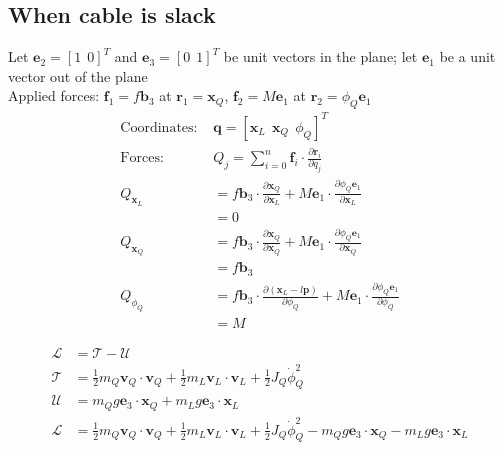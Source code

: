 \documentclass[11pt]{article}
\begin{document}
\newpage
\subsection{When cable is slack}

Let $\mathbf{e}_2 = [1 \ \ 0]^T$ and $\mathbf{e}_3 = [0 \ \ 1]^T$ be unit vectors in the plane; let $\mathbf{e}_1$ be a unit vector out of the plane \\
Applied forces: $\mathbf{f}_1 = f \mathbf{b}_3$ at $\mathbf{r}_1 = \mathbf{x}_Q$, $\mathbf{f}_2 = M \mathbf{e}_1$ at $\mathbf{r}_2 = \phi_Q \mathbf{e}_1$ \\ 

\mbox{} \newline
\begin{align*}
\text{Coordinates: } & \mathbf{q} = [\mathbf{x}_L \ \ \mathbf{x}_Q \ \ \phi_Q]^T \\
\text{Forces: } & Q_j = \displaystyle\sum\limits_{i=0}^n \mathbf{f}_i \cdot \frac{ \partial \mathbf{r}_i} { \partial q_j} \\
Q_{\mathbf{x}_L} &= f \mathbf{b}_3 \cdot \frac{ \partial \mathbf{x}_Q} { \partial \mathbf{x}_L} +  M \mathbf{e}_1 \cdot \frac{ \partial \phi_Q \mathbf{e}_1} { \partial \mathbf{x}_L} \\
&= 0 \\
Q_{\mathbf{x}_Q} &= f \mathbf{b}_3 \cdot \frac{ \partial \mathbf{x}_Q} { \partial \mathbf{x}_Q} +  M \mathbf{e}_1 \cdot \frac{ \partial \phi_Q \mathbf{e}_1} { \partial \mathbf{x}_Q} \\
&= f \mathbf{b}_3 \\
Q_{\phi_Q} &= f \mathbf{b}_3 \cdot \frac{ \partial (\mathbf{x}_L - l \mathbf{p})} { \partial \phi_Q} +  M \mathbf{e}_1 \cdot \frac{ \partial \phi_Q \mathbf{e}_1} { \partial \phi_Q} \\
&= M
\end{align*}

\mbox{} \newline
\begin{align*}
\mathcal{L} &= \mathcal{T} - \mathcal{U} \\
\mathcal{T} &= \frac{1}{2}m_Q \mathbf{v}_Q \cdot \mathbf{v}_Q + \frac{1}{2} m_L \mathbf{v}_L \cdot \mathbf{v}_L + \frac{1}{2} J_Q \dot{\phi}_Q^2 \\
\mathcal{U} &= m_Q g \mathbf{e}_3 \cdot \mathbf{x}_Q + m_L g \mathbf{e}_3 \cdot \mathbf{x}_L \\
\mathcal{L} &= \frac{1}{2}m_Q \mathbf{v}_Q \cdot \mathbf{v}_Q + \frac{1}{2} m_L \mathbf{v}_L \cdot \mathbf{v}_L + \frac{1}{2} J_Q \dot{\phi}_Q^2 - m_Q g \mathbf{e}_3 \cdot \mathbf{x}_Q - m_L g \mathbf{e}_3 \cdot \mathbf{x}_L \\
\end{align*}
\end{document}
